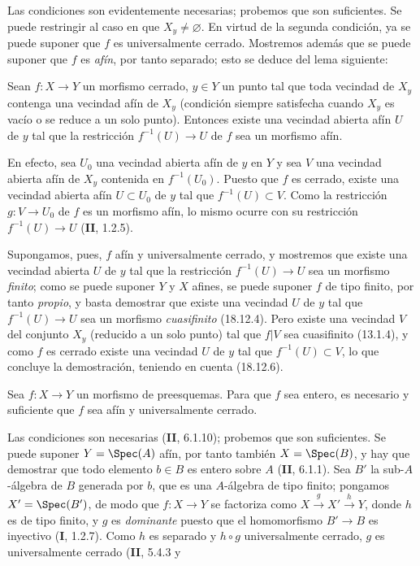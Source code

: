 Las condiciones son evidentemente necesarias; probemos que son suficientes. Se puede restringir al caso en que $X_y\neq\varnothing$. En virtud de la segunda condición, ya se puede suponer que $f$ es universalmente cerrado. Mostremos además que se puede suponer que $f$ es \emph{afín}, por tanto separado; esto se deduce del lema siguiente:

\begin{lemma}[18.12.7.1]
\label{IV.18.12.7.1}
Sean $f:X\to Y$ un morfismo cerrado, $y\in Y$ un punto tal que toda vecindad de $X_y$ contenga una vecindad afín de $X_y$ (condición siempre satisfecha cuando $X_y$ es vacío o se reduce a un solo punto). Entonces existe una vecindad abierta afín $U$ de $y$ tal que la restricción $f^{-1}(U)\to U$ de $f$ sea un morfismo afín.
\end{lemma}

En efecto, sea $U_0$ una vecindad abierta afín de $y$ en $Y$ y sea $V$ una vecindad abierta afín de $X_y$ contenida en $f^{-1}(U_0)$. Puesto que $f$ es cerrado, existe una vecindad abierta afín $U\subset U_0$ de $y$ tal que $f^{-1}(U)\subset V$. Como la restricción $g:V\to U_0$ de $f$ es un morfismo afín, lo mismo ocurre con su restricción $f^{-1}(U)\to U$ (\textbf{II}, 1.2.5).

Supongamos, pues, $f$ afín y universalmente cerrado, y mostremos que existe una vecindad abierta $U$ de $y$ tal que la restricción $f^{-1}(U)\to U$ sea un morfismo \emph{finito}; como se puede suponer $Y$ y $X$ afines, se puede suponer $f$ de tipo finito, por tanto \emph{propio}, y basta demostrar que existe una vecindad $U$ de $y$ tal que $f^{-1}(U)\to U$ sea un morfismo \emph{cuasifinito} (18.12.4). Pero existe una vecindad $V$ del conjunto $X_y$ (reducido a un solo punto) tal que $f|V$ sea cuasifinito (13.1.4), y como $f$ es cerrado existe una vecindad $U$ de $y$ tal que $f^{-1}(U)\subset V$, lo que concluye la demostración, teniendo en cuenta (18.12.6).

\begin{proposition}[18.12.8]
\label{IV.18.12.8}
Sea $f:X\to Y$ un morfismo de preesquemas. Para que $f$ sea entero, es necesario y suficiente que $f$ sea afín y universalmente cerrado.
\end{proposition}

Las condiciones son necesarias (\textbf{II}, 6.1.10); probemos que son suficientes. Se puede suponer $Y=\Spec(A)$ afín, por tanto también $X=\Spec(B)$, y hay que demostrar que todo elemento $b\in B$ es entero sobre $A$ (\textbf{II}, 6.1.1). Sea $B'$ la sub-$A$-álgebra de $B$ generada por $b$, que es una $A$-álgebra de tipo finito; pongamos $X'=\Spec(B')$, de modo que $f:X\to Y$ se factoriza como
$X\xrightarrow{g}X'\xrightarrow{h}Y$,
donde $h$ es de tipo finito, y $g$ es \emph{dominante} puesto que el homomorfismo $B'\to B$ es inyectivo (\textbf I, 1.2.7). Como $h$ es separado y $h\circ g$ universalmente cerrado, $g$ es universalmente cerrado (\textbf{II}, 5.4.3 y

